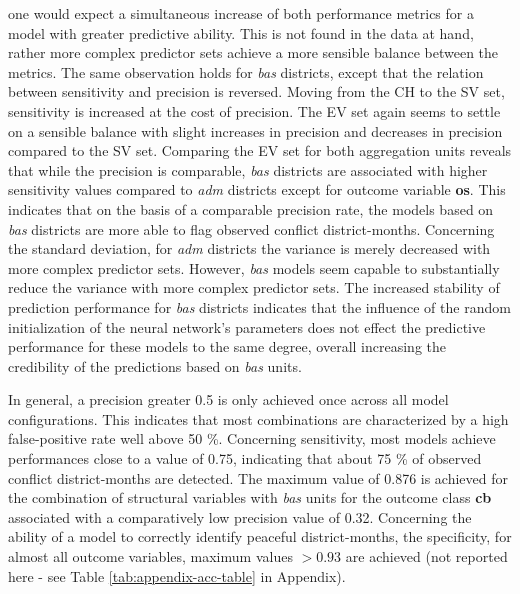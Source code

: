 \documentclass[a4paper,11pt]{article}
\begin{document}
one would expect a simultaneous increase of both performance metrics for a model
with greater predictive ability. This is not found in the data at hand, rather
more complex predictor sets achieve a more sensible balance between the metrics.
The same observation holds for \emph{bas} districts, except that the relation between
sensitivity and precision is reversed. Moving from the CH to the SV set, sensitivity
is increased at the cost of precision. The EV set again seems to settle on a
sensible balance with slight increases in precision and decreases in precision
compared to the SV set. Comparing the EV set for both aggregation units reveals that
while the precision is comparable, \emph{bas} districts are associated with higher sensitivity
values compared to \emph{adm} districts except for outcome variable \textbf{os}. This
indicates that on the basis of a comparable precision rate, the models based on
\emph{bas} districts are more able to flag observed conflict district-months.
Concerning the standard deviation, for \emph{adm} districts the variance is merely
decreased with more complex predictor sets. However, \emph{bas} models seem capable to
substantially reduce the variance with more complex predictor sets. The increased
stability of prediction performance for \emph{bas} districts indicates that the
influence of the random initialization of the neural network's parameters
does not effect the predictive performance for these models to the same degree,
overall increasing the credibility of the predictions based on \emph{bas} units.

In general, a precision greater 0.5 is only achieved once across all model
configurations. This indicates that most combinations are characterized by a high
false-positive rate well above 50 \%. Concerning sensitivity, most models achieve
performances close to a value of 0.75, indicating that about 75 \% of observed
conflict district-months are detected. The maximum value of 0.876 is achieved for
the combination of structural variables with \emph{bas} units for the outcome class
\textbf{cb} associated with a comparatively low precision value of 0.32. Concerning
the ability of a model to correctly identify peaceful district-months, the specificity,
for almost all outcome variables, maximum values \(>0.93\) are achieved
(not reported here - see Table \ref{tab:appendix-acc-table} in Appendix).
\end{document}
